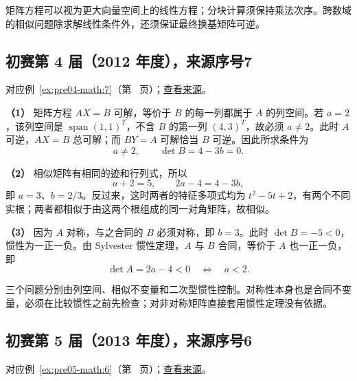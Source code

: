 \documentclass[12pt,fontset=fandol]{ctexart}
\begin{document}
\label{sec:solutions-9}

矩阵方程可以视为更大向量空间上的线性方程；分块计算须保持乘法次序。跨数域的相似问题除求解线性条件外，还须保证最终换基矩阵可逆。

\subsection{初赛第 4 届（2012 年度），来源序号7}\label{ans:pre04-math:7}\label{pr:pre04-math:7}

对应例~\ref{ex:pre04-math:7}（第~\pageref{ex:pre04-math:7} 页）；\href{https://github.com/lzxcr/cmc-mathematics/blob/64916fa1fdbc3e444a652eca204d5669058ee321/src/problems/preliminary/04/07.md}{查看来源}。

\begin{solve}

\textbf{（1）} 矩阵方程 $AX=B$ 可解，等价于 $B$ 的每一列都属于 $A$ 的列空间。若 $a=2$，该列空间是 $\operatorname{span}(1,1)^T$，不含 $B$ 的第一列 $(4,3)^T$，故必须 $a\ne2$。此时 $A$ 可逆，$AX=B$ 总可解；而 $BY=A$ 可解恰当 $B$ 可逆。因此所求条件为
\[
a\ne2,\qquad \det B=4-3b=0.
\]

\textbf{（2）} 相似矩阵有相同的迹和行列式，所以
\[
a+2=5,\qquad 2a-4=4-3b,
\]
即 $a=3$、$b=2/3$。反过来，这时两者的特征多项式均为 $t^2-5t+2$，有两个不同实根；两者都相似于由这两个根组成的同一对角矩阵，故相似。

\textbf{（3）} 因为 $A$ 对称，与之合同的 $B$ 必须对称，即 $b=3$。此时 $\det B=-5<0$，惯性为一正一负。由 Sylvester 惯性定理，$A$ 与 $B$ 合同，等价于 $A$ 也一正一负，即
\[
\det A=2a-4<0\quad\Longleftrightarrow\quad a<2.
\]

\end{solve}

\begin{remark}[方法与条件]

三个问题分别由列空间、相似不变量和二次型惯性控制。对称性本身也是合同不变量，必须在比较惯性之前先检查；对非对称矩阵直接套用惯性定理没有依据。

\end{remark}

\subsection{初赛第 5 届（2013 年度），来源序号6}\label{ans:pre05-math:6}\label{pr:pre05-math:6}

对应例~\ref{ex:pre05-math:6}（第~\pageref{ex:pre05-math:6} 页）；\href{https://github.com/lzxcr/cmc-mathematics/blob/64916fa1fdbc3e444a652eca204d5669058ee321/src/problems/preliminary/05/06.md}{查看来源}。
\end{document}
